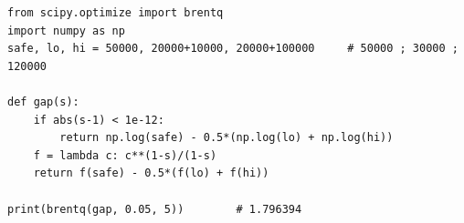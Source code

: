 \documentclass[12pt, letterpaper]{article}
\begin{document}
\begin{tcolorbox}[oddbox,title={Problem 2.7 \quad Measuring Risk Aversion}]
\begin{enumerate}
\end{enumerate}

\begin{tcolorbox}[theorybox,title={Verification code (executed)}]
\footnotesize
\begin{verbatim}
from scipy.optimize import brentq
import numpy as np
safe, lo, hi = 50000, 20000+10000, 20000+100000     # 50000 ; 30000 ; 120000

def gap(s):
    if abs(s-1) < 1e-12:
        return np.log(safe) - 0.5*(np.log(lo) + np.log(hi))
    f = lambda c: c**(1-s)/(1-s)
    return f(safe) - 0.5*(f(lo) + f(hi))

print(brentq(gap, 0.05, 5))        # 1.796394
\end{verbatim}
\end{tcolorbox}
\end{tcolorbox}
\end{document}

